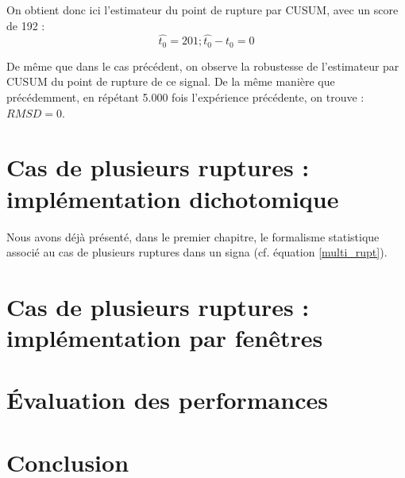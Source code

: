 \documentclass[french,12pt,notitlepage]{report}
\begin{document}
	On obtient donc ici l'estimateur du point de rupture par CUSUM, avec un score de 192 :
	\begin{equation*}
		\hat{t_0} = 201 ; \hat{t_0} - t_0 = 0
	\end{equation*}
	
	De même que dans le cas précédent, on observe la robustesse de l'estimateur par CUSUM du point de rupture de ce signal. De la même manière que précédemment, en répétant 5.000 fois l'expérience précédente, on trouve : $RMSD = 0$.
	
	\chapter{Cas de plusieurs ruptures : implémentation dichotomique}
	Nous avons déjà présenté, dans le premier chapitre, le formalisme statistique associé au cas de plusieurs ruptures dans un signa (cf. équation \ref{multi_rupt}).
	
	
	\chapter{Cas de plusieurs ruptures : implémentation par fenêtres}
	
	\chapter{Évaluation des performances}
	
	\chapter{Conclusion}
\end{document}

